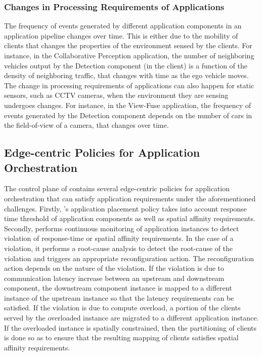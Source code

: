 \subsubsection{Changes in Processing Requirements of Applications}
The frequency of events generated by different application components in an application pipeline changes over time. This is either due to the mobility of clients that changes the properties of the environment sensed by the clients. For instance, in the Collaborative Perception application, the number of neighboring vehicles output by the Detection component (in the client) is a function of the density of neighboring traffic, that changes with time as the ego vehicle moves. The change in processing requirements of applications can also happen for static sensors, such as CCTV cameras, when the environment they are sensing undergoes changes. For instance, in the View-Fuse application, the frequency of events generated by the Detection component depends on the number of cars in the field-of-view of a camera, that changes over time.

\subsection{Edge-centric Policies for Application Orchestration}
The control plane of \oneedge{} contains several edge-centric policies for application orchestration that can satisfy application requirements under the aforementioned challenges. Firstly, \oneedge{}'s application placement policy takes into account response time threshold of application components as well as spatial affinity requirements. Secondly, \oneedge{} performs continuous monitoring of application instances to detect violation of response-time or spatial affinity requirements. In the case of a violation, it performs a root-cause analysis to detect the root-cause of the violation and triggers an appropriate reconfiguration action. The reconfiguration action depends on the nature of the violation. If the violation is due to communication latency increase between an upstream and downstream component, the downstream component instance is mapped to a different instance of the upstream instance so that the latency requirements can be satisfied. If the violation is due to compute overload, a portion of the clients served by the overloaded instance are migrated to a different application instance. If the overloaded instance is spatially constrained, then the partitioning of clients is done so as to ensure that the resulting mapping of clients satisfies spatial affinity requirements.

